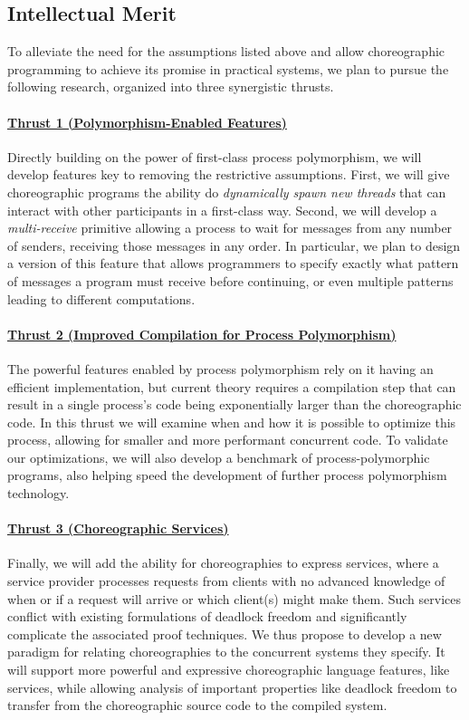 \subsection{Intellectual Merit}

To alleviate the need for the assumptions listed above and allow choreographic programming to achieve its promise in practical systems,
we plan to pursue the following research, organized into three synergistic thrusts.

\paragraph{\hyperref[sec:t1]{Thrust 1 (Polymorphism-Enabled Features)}}
Directly building on the power of first-class process polymorphism, we will develop features key to removing the restrictive assumptions.
First, we will give choreographic programs the ability do \emph{dynamically spawn new threads} that can interact with other participants in a first-class way.
Second, we will develop a \emph{multi-receive} primitive allowing a process to wait for messages from any number of senders, receiving those messages in any order.
In particular, we plan to design a version of this feature that allows programmers to specify exactly what pattern of messages a program must receive before continuing,
or even multiple patterns leading to different computations.

\paragraph{\hyperref[sec:t2]{Thrust 2 (Improved Compilation for Process Polymorphism)}}
The powerful features enabled by process polymorphism rely on it having an efficient implementation,
but current theory requires a compilation step that can result in a single process's code being exponentially larger than the choreographic code.
In this thrust we will examine when and how it is possible to optimize this process, allowing for smaller and more performant concurrent code.
To validate our optimizations, we will also develop a benchmark of process-polymorphic programs,
also helping speed the development of further process polymorphism technology.

\paragraph{\hyperref[sec:t3]{Thrust 3 (Choreographic Services)}}
Finally, we will add the ability for choreographies to express services, where a service provider processes requests from clients
with no advanced knowledge of when or if a request will arrive or which client(s) might make them.
Such services conflict with existing formulations of deadlock freedom and significantly complicate the associated proof techniques.
We thus propose to develop a new paradigm for relating choreographies to the concurrent systems they specify.
It will support more powerful and expressive choreographic language features, like services,
while allowing analysis of important properties like deadlock freedom to transfer from the choreographic source code to the compiled system.


